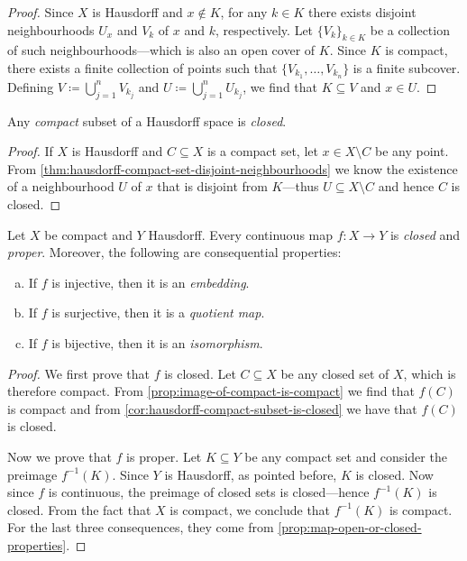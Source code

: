 \begin{proof}
Since \(X\) is Hausdorff and \(x \notin K\), for any \(k \in K\) there exists
disjoint neighbourhoods \(U_x\) and \(V_k\) of \(x\) and \(k\),
respectively. Let \(\{V_{k}\}_{k \in K}\) be a collection of such neighbourhoods---which is also an open cover of \(K\). Since \(K\) is compact, there exists a
finite collection of points such that \(\{V_{k_1}, \dots, V_{k_n}\}\) is a
finite subcover. Defining \(V \coloneq \bigcup_{j=1}^n V_{k_j}\) and
\(U \coloneq \bigcup_{j=1}^n U_{k_j}\), we find that \(K \subseteq V\) and
\(x \in U\).
\end{proof}

\begin{corollary}
\label{cor:hausdorff-compact-subset-is-closed}
Any \emph{compact} subset of a Hausdorff space is \emph{closed}.
\end{corollary}

\begin{proof}
If \(X\) is Hausdorff and \(C \subseteq X\) is a compact set, let
\(x \in X \setminus C\) be any point. From
\cref{thm:hausdorff-compact-set-disjoint-neighbourhoods} we know the existence
of a neighbourhood \(U\) of \(x\) that is disjoint from \(K\)---thus
\(U \subseteq X \setminus C\) and hence \(C\) is closed.
\end{proof}

\begin{corollary}
\label{cor:map-compact-to-hausdorff-is-closed}
Let \(X\) be compact and \(Y\) Hausdorff. Every continuous map \(f: X \to Y\) is
\emph{closed} and \emph{proper}. Moreover, the following are consequential
properties:
\begin{enumerate}[(a)]\setlength\itemsep{0em}
\item If \(f\) is injective, then it is an \emph{embedding}.
\item If \(f\) is surjective, then it is a \emph{quotient map}.
\item If \(f\) is bijective, then it is an \emph{isomorphism}.
\end{enumerate}
\end{corollary}

\begin{proof}
We first prove that \(f\) is closed. Let \(C \subseteq X\) be any closed set of
\(X\), which is therefore compact. From \cref{prop:image-of-compact-is-compact}
we find that \(f(C)\) is compact and from
\cref{cor:hausdorff-compact-subset-is-closed} we have that \(f(C)\) is closed.

Now we prove that \(f\) is proper. Let \(K \subseteq Y\) be any compact set and
consider the preimage \(f^{-1}(K)\). Since \(Y\) is Hausdorff, as pointed
before, \(K\) is closed. Now since \(f\) is continuous, the preimage of closed
sets is closed---hence \(f^{-1}(K)\) is closed. From the fact that \(X\) is
compact, we conclude that \(f^{-1}(K)\) is compact. For the last three
consequences, they come from \cref{prop:map-open-or-closed-properties}.
\end{proof}

